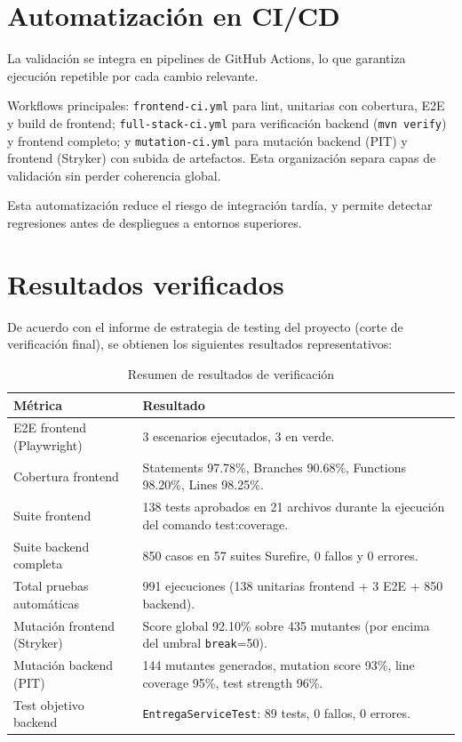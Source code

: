 \section{Automatizaci\'on en CI/CD}

La validaci\'on se integra en pipelines de GitHub Actions,
lo que garantiza ejecuci\'on repetible por cada cambio relevante.

Workflows principales: \texttt{frontend-ci.yml} para lint, unitarias con cobertura, E2E y build de frontend; \texttt{full-stack-ci.yml} para verificaci\'on backend (\texttt{mvn verify}) y frontend completo; y \texttt{mutation-ci.yml} para mutaci\'on backend (PIT) y frontend (Stryker) con subida de artefactos. Esta organizaci\'on separa capas de validaci\'on sin perder coherencia global.

Esta automatizaci\'on reduce el riesgo de integraci\'on tard\'ia,
y permite detectar regresiones antes de despliegues a entornos superiores.

\FloatBarrier
\section{Resultados verificados}

De acuerdo con el informe de estrategia de testing del proyecto
(corte de verificaci\'on final), se obtienen los siguientes resultados representativos:

\begin{table}[!htbp]
\centering
\begin{tabular}{|P{4.4cm}|P{7.4cm}|}
\hline
\textbf{M\'etrica} & \textbf{Resultado} \\
\hline
E2E frontend (Playwright) & 3 escenarios ejecutados, 3 en verde. \\
\hline
Cobertura frontend & Statements 97.78\%, Branches 90.68\%, Functions 98.20\%, Lines 98.25\%. \\
\hline
Suite frontend & 138 tests aprobados en 21 archivos durante la ejecuci\'on del comando test:coverage. \\
\hline
Suite backend completa & 850 casos en 57 suites Surefire, 0 fallos y 0 errores. \\
\hline
Total pruebas autom\'aticas & 991 ejecuciones (138 unitarias frontend + 3 E2E + 850 backend). \\
\hline
Mutaci\'on frontend (Stryker) & Score global 92.10\% sobre 435 mutantes (por encima del umbral \texttt{break}=50). \\
\hline
Mutaci\'on backend (PIT) & 144 mutantes generados, mutation score 93\%, line coverage 95\%, test strength 96\%. \\
\hline
Test objetivo backend & \texttt{EntregaServiceTest}: 89 tests, 0 fallos, 0 errores. \\
\hline
\end{tabular}
\caption{Resumen de resultados de verificaci\'on}
\label{tab:resultados-pruebas}
\end{table}

